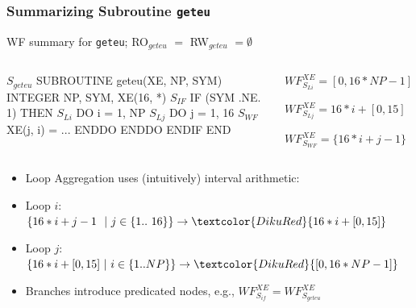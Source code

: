 \documentclass{beamer}
\renewcommand{\emph}[1]{\textcolor{structure}{#1}}
\newcommand{\emp}[1]{\textcolor{DikuRed}{ #1}}
\newcommand{\mymath}[1]{$ #1 $}
\newcommand{\myindx}[1]{_{#1}}
\newcommand{\myindu}[1]{^{#1}}
\begin{document}
\begin{frame}[fragile,t]
  \frametitle{Summarizing Subroutine {\tt geteu}}

\begin{block}{WF summary for {\tt geteu}; RO$_{geteu}$ $=$ RW$_{geteu}$ $= \emptyset$ } \vspace{-1ex}
\begin{columns} 
\begin{colorcode}[fontsize=\scriptsize]
\mymath{S\myindx{geteu}}  SUBROUTINE geteu(XE, NP, SYM)
         INTEGER NP, SYM, XE(16, *)  
\mymath{S\myindx{IF}}       \emph{IF (SYM .NE. 1) THEN}
\mymath{S\myindx{Li}}         \emp{DO i = 1, NP}
\mymath{S\myindx{Lj}}           \emp{DO j = 1, 16}
\mymath{S\myindx{WF}}             \alert{XE(j, i)} = ...
             \emp{ENDDO} 
           \emp{ENDDO}
         \emph{ENDIF}
       END
\end{colorcode}
\begin{colorcode}[fontsize=\scriptsize]




\emp{\mymath{WF\myindu{XE}\myindx{S\myindx{Li}} = [0,16*NP-1]}}

\emp{\mymath{WF\myindu{XE}\myindx{S\myindx{Lj}} = 16*i + [0,15]}}

\alert{\mymath{WF\myindu{XE}\myindx{S\myindx{WF}} = \{16*i+j-1\}}}
\end{colorcode}
\end{columns}
\end{block}


\begin{itemize}
    \item Loop Aggregation uses (intuitively) interval arithmetic: \smallskip
    \item Loop $i$: $\{16*i + j - 1 \mbox{ }\mbox{ }|\mbox{ } j \in \{1..\mbox{ }16\}\} \rightarrow \emp{16*i + [0,15]}$ \smallskip
    \item Loop $j$: $\{16*i + [0,15] \mbox{ }|\mbox{ } i \in \{1..NP\}\} \rightarrow \emp{[0, 16*NP-1]}$  \smallskip
    \item Branches introduce predicated nodes, e.g., \emph{$WF^{XE}_{S_{if}} = WF^{XE}_{S_{geteu}}$} 
\end{itemize}
\end{frame}


\end{document}
